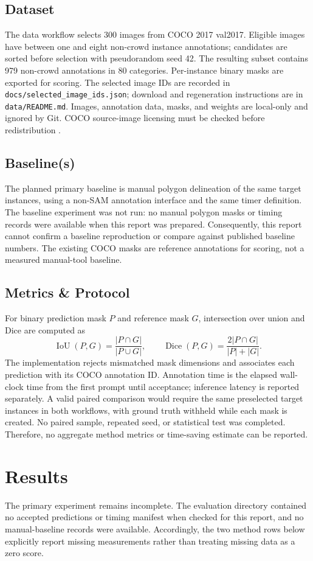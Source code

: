 \documentclass[11pt]{article}
\begin{document}
\subsection{Dataset}
The data workflow selects 300 images from COCO 2017 val2017. Eligible images
have between one and eight non-crowd instance annotations; candidates are
sorted before selection with pseudorandom seed 42. The resulting subset
contains 979 non-crowd annotations in 80 categories. Per-instance binary
masks are exported for scoring. The selected image IDs are recorded in
\texttt{docs/selected\_image\_ids.json}; download and regeneration instructions
are in \texttt{data/README.md}. Images, annotation data, masks, and weights are
local-only and ignored by Git. COCO source-image licensing must be checked
before redistribution \citep{cocoTerms}.

\subsection{Baseline(s)}
The planned primary baseline is manual polygon delineation of the same target
instances, using a non-SAM annotation interface and the same timer definition.
The baseline experiment was not run: no manual polygon masks or timing records
were available when this report was prepared. Consequently, this report cannot
confirm a baseline reproduction or compare against published baseline numbers.
The existing COCO masks are reference annotations for scoring, not a measured
manual-tool baseline.

\subsection{Metrics \& Protocol}
For binary prediction mask $P$ and reference mask $G$, intersection over union
and Dice are computed as
\[
\operatorname{IoU}(P,G)=\frac{|P\cap G|}{|P\cup G|},\qquad
\operatorname{Dice}(P,G)=\frac{2|P\cap G|}{|P|+|G|}.
\]
The implementation rejects mismatched mask dimensions and associates each
prediction with its COCO annotation ID. Annotation time is the elapsed
wall-clock time from the first prompt until acceptance; inference latency is
reported separately. A valid paired comparison would require the same
preselected target instances in both workflows, with ground truth withheld
while each mask is created. No paired sample, repeated seed, or statistical
test was completed. Therefore, no aggregate method metrics or time-saving
estimate can be reported.

\section{Results}
\label{sec:results}
The primary experiment remains incomplete. The evaluation directory contained
no accepted predictions or timing manifest when checked for this report, and
no manual-baseline records were available. Accordingly, the two method rows
below explicitly report missing measurements rather than treating missing
data as a zero score.
\end{document}
